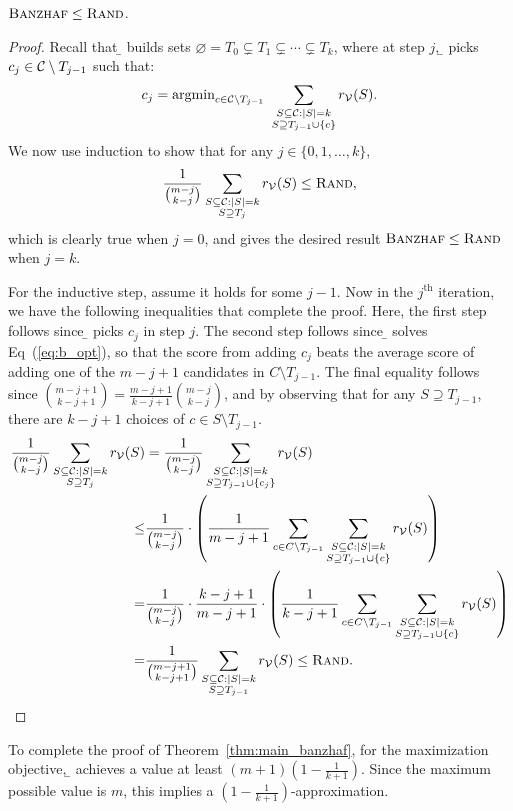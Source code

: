 \begin{theorem}
${\normalfont\textsc{Banzhaf}} \leq {\normalfont\textsc{Rand}}$.
\label{thm:banzhaf_better_than_rand}
\end{theorem}
\begin{proof}
Recall that \b{} builds sets $\varnothing = T_0 \subsetneq T_1 \subsetneq \cdots \subsetneq T_k$, where at step $j$, \b{} picks $c_j \in \mathcal{C} \setminus T_{j - 1}$ such that:
\begin{equation}
    \label{eq:b_opt}
c_j = \mbox{argmin}_{c \in \mathcal{C} \setminus T_{j - 1} } \ \sum_{\substack{S \subseteq \mathcal{C}: |S| = k \\ S \supseteq T_{j - 1} \cup \{c\}}} r_{\mathcal{V}}(S).
\end{equation}
We now use induction to show that for any $j \in \{0, 1, \ldots, k\}$,
\[
\frac{1}{\binom{m - j}{k - j}} \sum_{\substack{S \subseteq \mathcal{C}: |S| = k \\ S \supseteq T_j}} r_{\mathcal{V}}(S) \leq {\normalfont\textsc{Rand}},
\]
which is clearly true when $j = 0$, and gives the desired result ${\normalfont\textsc{Banzhaf}} \leq {\normalfont\textsc{Rand}}$ when $j = k$.

For the inductive step, assume it holds for some $j - 1$. Now in the $j^{\text{th}}$ iteration, we have the following inequalities that complete the proof. Here, the first step follows since \b{} picks $c_j$ in step $j$. The second step follows since \b{} solves Eq~(\ref{eq:b_opt}), so that the score from adding $c_j$ beats the average score of adding one of the $m-j+1$ candidates in $C \setminus T_{j-1}$.  The final equality follows since $\binom{m - j + 1}{k - j + 1} = \frac{m-j+1}{k-j+1} \binom{m - j}{k - j}$, and by observing that for any $S \supseteq T_{j-1}$, there are $k-j+1$ choices of $c \in S \setminus T_{j-1}$. 
\begin{align*}
\frac{1}{\binom{m - j}{k - j}} \sum_{\substack{S \subseteq \mathcal{C}: |S| = k \\ S \supseteq T_j}} r_{\mathcal{V}}(S) &= \frac{1}{\binom{m - j}{k - j}} \sum_{\substack{S \subseteq \mathcal{C}: |S| = k \\ S \supseteq T_{j - 1} \cup \{c_j\}}} r_{\mathcal{V}}(S)\\
\leq &\frac{1}{\binom{m - j}{k - j}} \cdot \left(\frac{1}{m-j+1} \sum_{c \in C \setminus T_{j - 1}} \sum_{\substack{S \subseteq \mathcal{C}: |S| = k \\ S \supseteq T_{j - 1} \cup \{c\}}} r_{\mathcal{V}}(S) \right)\\
= &  \frac{1}{\binom{m - j}{k - j}} \cdot \frac{k - j + 1}{m - j + 1} \cdot \left(\frac{1}{k-j+1} \sum_{c \in C \setminus T_{j - 1}} \sum_{\substack{S \subseteq \mathcal{C}: |S| = k \\ S \supseteq T_{j - 1} \cup \{c\}}} r_{\mathcal{V}}(S) \right)\\
= &\frac{1}{\binom{m - j + 1}{k - j + 1}} \sum_{\substack{S \subseteq \mathcal{C}: |S| = k \\ S \supseteq T_{j - 1}}} r_{\mathcal{V}}(S) \leq {\normalfont\textsc{Rand}}. \qedhere
\end{align*}
\end{proof}

To complete the proof of Theorem~\ref{thm:main_banzhaf}, for the maximization objective, \b{} achieves a value at least $(m+1) \left(1 -  \frac{1}{k+1} \right)$. Since the maximum possible value is $m$, this implies a $\left(1 - \frac{1}{k+1}\right)$-approximation.
